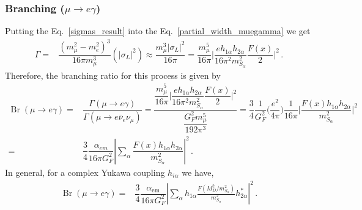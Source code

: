 \subsubsection{ Branching ($\mu \rightarrow e \gamma$)}
Putting the Eq.~\eqref{sigmas_result} into the Eq.~\eqref{partial_width_muegamma} we get
\begin{align}
\Gamma =&\dfrac{(m_{\mu}^2-m_e^2)^3}{16\pi m_{\mu}^3}(|\sigma_L|^2) \approx \dfrac{m_{\mu}^3 |\sigma_L|^2}{16\pi}
= \dfrac{m_{\mu}^5}{16\pi}\bigg| \dfrac{e h_{1\alpha}h_{2\alpha}}{16 \pi^2 m_{S_\alpha}^2} \dfrac{F(x)}{2} \bigg|^2\,.
\end{align}
Therefore, the branching ratio for this process is given by
\begin{align}
\operatorname{Br}(\mu \rightarrow e \gamma) 
=& \dfrac{\Gamma(\mu \rightarrow e \gamma )}{\Gamma(\mu \rightarrow e \bar{\nu}_e \nu_{\mu})}
=\dfrac{\dfrac{m_{\mu}^5}{16\pi}\bigg| \dfrac{e h_{1\alpha}h_{2\alpha}}{16 \pi^2 m_{S_\alpha}^2} \dfrac{F(x)}{2} \bigg|^2}{ \dfrac{G_F^2 m_{\mu}^5}{192\pi^3} }
=\dfrac{3}{4}\dfrac{1}{G_F^2}\bigg(\dfrac{e^2}{4\pi}\bigg)\dfrac{1}{16\pi}\bigg|\dfrac{F(x)h_{1\alpha}h_{2\alpha}}{m_{S_\alpha}^2}\bigg|^2 \nonumber \\
=&\dfrac{3}{4}\dfrac{\alpha_{em}}{16 \pi G_F^2}\left|\sum_{\alpha}\dfrac{F(x)h_{1\alpha}h_{2\alpha}}{m_{S_\alpha}^2}  \right|^2 \,.
\end{align}
%
In general, for a complex Yukawa coupling $h_{i\alpha}$ we have,
\begin{align}
\operatorname{Br}(\mu \rightarrow e \gamma)=&\dfrac{3}{4}\dfrac{\alpha_{\text{em}}}{16 \pi G_F^2}\left|\sum_{\alpha}
h_{1\alpha}\frac{F\left(M_D^2/m_{S_{\alpha}}^2  \right) }{m_{S_\alpha}^2}h_{2\alpha}^{*}  \right|^2 \,.
\end{align}











